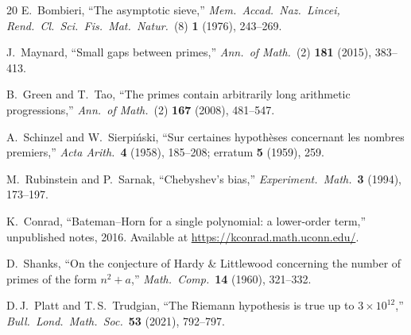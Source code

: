 \documentclass[11pt,a4paper]{article}
\begin{document}
\begin{thebibliography}{20}
E.~Bombieri,
``The asymptotic sieve,''
\textit{Mem.\ Accad.\ Naz.\ Lincei, Rend.\ Cl.\ Sci.\ Fis.\ Mat.\ Natur.}\ (8) \textbf{1} (1976), 243--269.

J.~Maynard,
``Small gaps between primes,''
\textit{Ann.\ of Math.}\ (2) \textbf{181} (2015), 383--413.

B.~Green and T.~Tao,
``The primes contain arbitrarily long arithmetic progressions,''
\textit{Ann.\ of Math.}\ (2) \textbf{167} (2008), 481--547.

A.~Schinzel and W.~Sierpi\'nski,
``Sur certaines hypoth\`eses concernant les nombres premiers,''
\textit{Acta Arith.}\ \textbf{4} (1958), 185--208; erratum \textbf{5} (1959), 259.

M.~Rubinstein and P.~Sarnak,
``Chebyshev's bias,''
\textit{Experiment.\ Math.}\ \textbf{3} (1994), 173--197.

K.~Conrad,
``Bateman--Horn for a single polynomial: a lower-order term,''
unpublished notes, 2016.
Available at \url{https://kconrad.math.uconn.edu/}.

D.~Shanks,
``On the conjecture of Hardy \& Littlewood concerning the number of primes of the form $n^2 + a$,''
\textit{Math.\ Comp.}\ \textbf{14} (1960), 321--332.

D.\,J.~Platt and T.\,S.~Trudgian,
``The Riemann hypothesis is true up to $3 \times 10^{12}$,''
\textit{Bull.\ Lond.\ Math.\ Soc.}\ \textbf{53} (2021), 792--797.

\end{thebibliography}
\end{document}
